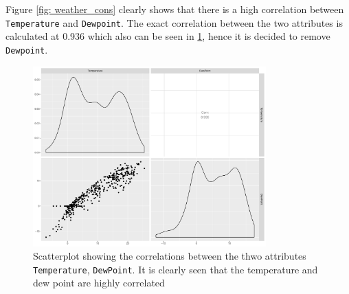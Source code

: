 \noindent Figure \ref{fig: weather_cons} clearly shows that there is a high correlation between \texttt{Temperature} and \texttt{Dewpoint}. The exact correlation between the two attributes is calculated at 0.936 which also can be seen in \cref{fig: gg_cor}, hence it is decided to remove \texttt{Dewpoint}. 
\begin{figure}
    \centering
    \includegraphics[width=0.8\textwidth]{../../../figures/gg_cor.pdf}
    \caption{Scatterplot showing the correlations between the thwo attributes \texttt{Temperature}, \texttt{DewPoint}. It is clearly seen that the temperature and dew point are highly correlated}
    \label{fig: gg_cor}
\end{figure}
 
